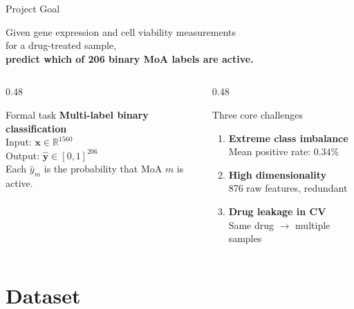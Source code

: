 \documentclass[aspectratio=169, 10pt]{beamer}
\begin{document}
\begin{frame}{Project Goal}
  \begin{center}
    \Large
    Given gene expression and cell viability measurements\\[0.4em]
    for a drug-treated sample,\\[0.6em]
    \textbf{predict which of 206 binary MoA labels are active.}
  \end{center}
  \vspace{0.5em}
  \begin{columns}[T]
    \begin{column}{0.48\textwidth}
      \begin{block}{Formal task}
        \textbf{Multi-label binary classification}\\[0.3em]
        Input: $\mathbf{x} \in \mathbb{R}^{1560}$\\[0.2em]
        Output: $\hat{\mathbf{y}} \in [0,1]^{206}$\\[0.2em]
        Each $\hat{y}_m$ is the probability that MoA $m$ is active.
      \end{block}
    \end{column}
    \begin{column}{0.48\textwidth}
      \begin{alertblock}{Three core challenges}
        \begin{enumerate}
          \item \textbf{Extreme class imbalance}\\
                Mean positive rate: $0.34\%$
          \item \textbf{High dimensionality}\\
                876 raw features, redundant
          \item \textbf{Drug leakage in CV}\\
                Same drug $\to$ multiple samples
        \end{enumerate}
      \end{alertblock}
    \end{column}
  \end{columns}
\end{frame}

\section{Dataset}
\end{document}
